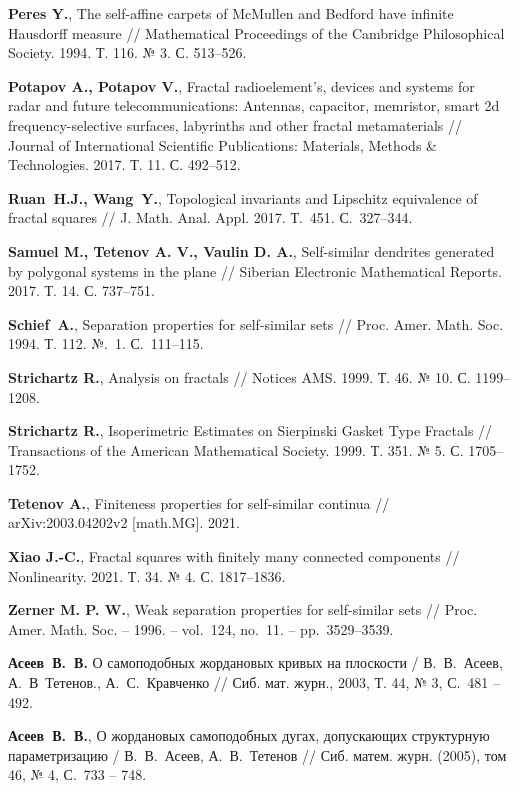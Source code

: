 \begin{thebibliography}{99}
{\bf Peres Y.},
The self-affine carpets of McMullen and Bedford have infinite Hausdorff measure // 
Mathematical Proceedings of the Cambridge Philosophical Society. 1994. Т. 116. № 3. С. 513--526.

{\bf Potapov A., Potapov V.},
Fractal radioelement’s, devices and systems for radar and future telecommunications: Antennas, capacitor, memristor, smart 2d frequency-selective surfaces, labyrinths and other fractal metamaterials // Journal of International Scientific Publications: Materials, Methods \& Technologies. 2017. Т. 11. С. 492--512.

{\bf Ruan~H.J., Wang~Y.},
Topological invariants and Lipschitz equivalence of fractal squares //
J. Math. Anal. Appl.  2017. Т.~451. С.~327--344.

{\bf Samuel M., Tetenov A. V., Vaulin D. A.},
Self-similar dendrites generated by polygonal systems in the plane //
Siberian Electronic Mathematical Reports. 2017. Т. 14. С. 737--751.

{\bf Schief~A.},  Separation properties for self-similar sets // 
Proc. Amer. Math. Soc. 1994. Т. 112. №.~1. С.~111--115.

{\bf Strichartz R.},
Analysis on fractals // 
Notices AMS. 1999. Т. 46. № 10. С. 1199--1208.

{\bf Strichartz R.},
Isoperimetric Estimates on Sierpinski Gasket Type Fractals // 
Transactions of the American Mathematical Society. 1999. Т. 351. № 5. С. 1705--1752.

{\bf Tetenov A.},
Finiteness properties for self-similar continua // 
arXiv:2003.04202v2 [math.MG]. 2021.

{\bf Xiao J.-C.},
Fractal squares with finitely many connected components // 
Nonlinearity. 2021. Т. 34. № 4. С. 1817--1836.

{\bf Zerner M. P. W.},
Weak separation properties for self-similar sets // 
Proc. Amer. Math. Soc.  -- 1996. -- vol.~124, no.~11. -- pp.~3529--3539.

{\bf Асеев~В.~В.} 
О самоподобных жордановых кривых на плоскости / 
В.~В.~Асеев, А.~В~Тетенов., А.~С.~Кравченко //
Сиб. мат. журн., 2003, Т. 44, № 3, С.~481 -- 492.

{\bf Асеев~В.~В.},
О жордановых самоподобных дугах, допускающих структурную параметризацию /
В.~В.~Асеев, А.~В.~Тетенов //
Сиб. матем. журн. (2005), том 46, № 4, С.~733 -- 748.


\end{thebibliography}
